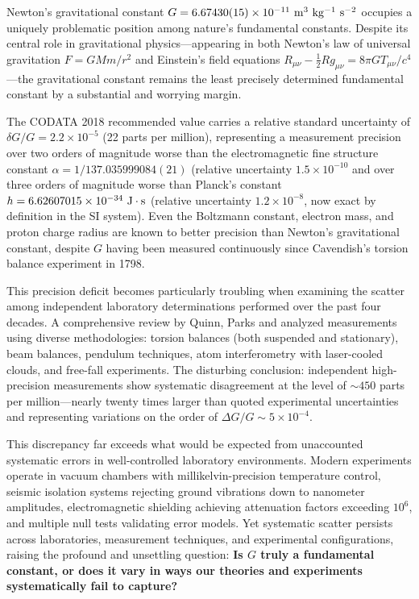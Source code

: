 \documentclass[10pt,a4paper]{article}
\begin{document}
Newton's \cite{Newton1687} gravitational constant
\(G = 6.67430(15) \times 10^{-11}~{\rm m^3~kg^{-1}~s^{-2}}\) occupies a
uniquely problematic position among nature's fundamental constants.
Despite its central role in gravitational physics---appearing in both
Newton's law of universal gravitation \(F = GMm/r^2\) and Einstein's
field equations \cite{Einstein1915}
\(R_{\mu\nu} - \frac{1}{2}Rg_{\mu\nu} = 8\pi G T_{\mu\nu}/c^4\)---the
gravitational constant remains the least precisely determined
fundamental constant by a substantial and worrying margin.

The CODATA 2018 \cite{ref35,Mohr2016,Tiesinga2021} recommended value carries a relative standard
uncertainty of \(\delta G/G = 2.2 \times 10^{-5}\) (22 parts per
million), representing a measurement precision over two orders of
magnitude worse than the electromagnetic fine structure constant
\(\alpha = 1/137.035999084(21)\) (relative uncertainty
\(1.5 \times 10^{-10}\) and over three orders of magnitude worse than
Planck's constant \(h = 6.62607015 \times 10^{-34}~{\rm J \cdot s}\)
(relative uncertainty \(1.2 \times 10^{-8}\), now exact by definition in
the SI system). Even the Boltzmann constant, electron mass, and proton
charge radius are known to better precision than Newton's gravitational
constant, despite \(G\) having been measured continuously since
Cavendish's torsion balance experiment in 1798.

This precision deficit becomes particularly troubling when examining the
scatter among independent laboratory determinations performed over the
past four decades. A comprehensive review by Quinn, Parks and \cite{Quinn2013} analyzed measurements using diverse methodologies: torsion
balances (both suspended and stationary), beam balances, pendulum
techniques, atom interferometry with laser-cooled clouds, and free-fall
experiments. The disturbing conclusion: independent high-precision
measurements show systematic disagreement at the level of \(\sim 450\)
parts per million---nearly twenty times larger than quoted experimental
uncertainties and representing variations on the order of
\(\Delta G/G \sim 5 \times 10^{-4}\).

This discrepancy far exceeds what would be expected from unaccounted
systematic errors in well-controlled laboratory environments. Modern
experiments operate in vacuum chambers with millikelvin-precision
temperature control, seismic isolation systems rejecting ground
vibrations down to nanometer amplitudes, electromagnetic shielding
achieving attenuation factors exceeding \(10^6\), and multiple null
tests validating error models. Yet systematic scatter persists across
laboratories, measurement techniques, and experimental configurations,
raising the profound and unsettling question: \textbf{Is \(G\) truly a
fundamental constant, or does it vary in ways our theories and
experiments systematically fail to capture?}
\end{document}
